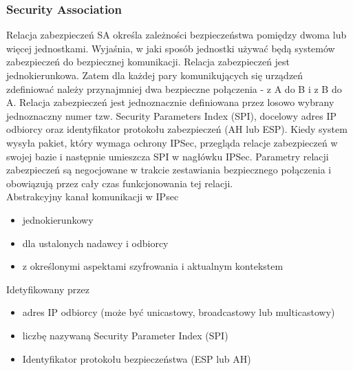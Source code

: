 \documentclass[12pt]{article}
\begin{document}
    \subsubsection{Security Association}
    Relacja zabezpieczeń SA określa zależności bezpieczeństwa pomiędzy dwoma lub więcej jednostkami. Wyjaśnia, w jaki sposób jednostki używać będą systemów zabezpieczeń do bezpiecznej komunikacji. Relacja zabezpieczeń jest jednokierunkowa. Zatem dla każdej pary komunikujących się urządzeń zdefiniować należy przynajmniej dwa bezpieczne połączenia - z A do B i z B do A. Relacja zabezpieczeń jest jednoznacznie definiowana przez losowo wybrany jednoznaczny numer tzw. Security Parameters Index (SPI), docelowy adres IP odbiorcy oraz identyfikator protokołu zabezpieczeń (AH lub ESP). Kiedy system wysyła pakiet, który wymaga ochrony IPSec, przegląda relacje zabezpieczeń w swojej bazie i następnie umieszcza SPI w nagłówku IPSec. Parametry relacji zabezpieczeń są negocjowane w trakcie zestawiania bezpiecznego połączenia i obowiązują przez cały czas funkcjonowania tej relacji.\\
    
    Abstrakcyjny kanał komunikacji w IPsec
    \begin{itemize}
        \item jednokierunkowy
        \item dla ustalonych nadawcy i odbiorcy
        \item z określonymi aspektami szyfrowania i aktualnym kontekstem
    \end{itemize}
    
    Idetyfikowany przez
    \begin{itemize}
        \item adres IP odbiorcy (może być unicastowy, broadcastowy lub multicastowy)
        \item liczbę nazywaną Security Parameter Index (SPI)
        \item Identyfikator protokołu bezpieczeństwa (ESP lub AH)
    \end{itemize}
\end{document}
